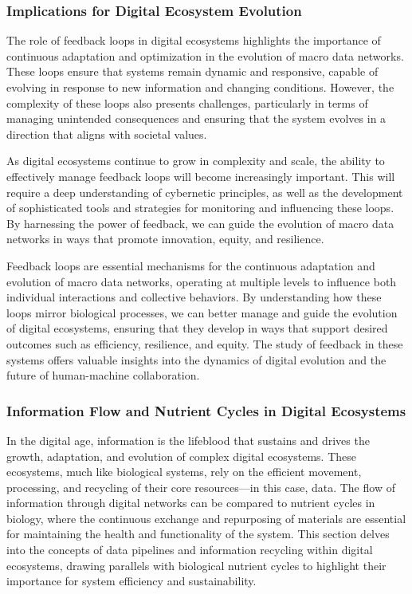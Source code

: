 \documentclass[12pt,twoside]{article}
\begin{document}
\subsubsection{Implications for Digital Ecosystem Evolution}

The role of feedback loops in digital ecosystems highlights the importance of continuous adaptation and optimization in the evolution of macro data networks. These loops ensure that systems remain dynamic and responsive, capable of evolving in response to new information and changing conditions. However, the complexity of these loops also presents challenges, particularly in terms of managing unintended consequences and ensuring that the system evolves in a direction that aligns with societal values.

As digital ecosystems continue to grow in complexity and scale, the ability to effectively manage feedback loops will become increasingly important. This will require a deep understanding of cybernetic principles, as well as the development of sophisticated tools and strategies for monitoring and influencing these loops. By harnessing the power of feedback, we can guide the evolution of macro data networks in ways that promote innovation, equity, and resilience.

Feedback loops are essential mechanisms for the continuous adaptation and evolution of macro data networks, operating at multiple levels to influence both individual interactions and collective behaviors. By understanding how these loops mirror biological processes, we can better manage and guide the evolution of digital ecosystems, ensuring that they develop in ways that support desired outcomes such as efficiency, resilience, and equity. The study of feedback in these systems offers valuable insights into the dynamics of digital evolution and the future of human-machine collaboration.

\subsubsection{Information Flow and Nutrient Cycles in Digital Ecosystems}

In the digital age, information is the lifeblood that sustains and drives the growth, adaptation, and evolution of complex digital ecosystems. These ecosystems, much like biological systems, rely on the efficient movement, processing, and recycling of their core resources—in this case, data. The flow of information through digital networks can be compared to nutrient cycles in biology, where the continuous exchange and repurposing of materials are essential for maintaining the health and functionality of the system. This section delves into the concepts of data pipelines and information recycling within digital ecosystems, drawing parallels with biological nutrient cycles to highlight their importance for system efficiency and sustainability.
\end{document}
